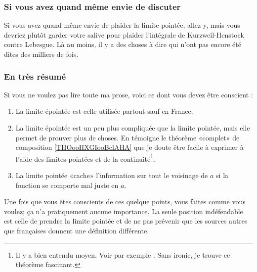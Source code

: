\subsubsection{Si vous avez quand même envie de discuter}

Si vous avez quand même envie de plaider la limite pointée, allez-y, mais vous devriez plutôt garder votre salive pour plaider l'intégrale de Kurzweil-Henstock\cite{BIBooLGJXooZhEXJf} contre Lebesgue. Là au moins, il y a des choses à dire qui n'ont pas encore été dites des milliers de fois.

\subsubsection{En très résumé}

Si vous ne voulez pas lire toute ma prose, voici ce dont vous devez être conscient :
\begin{enumerate}
	\item
	      La limite épointée est celle utilisée partout sauf en France.
	\item
	      La limite épointée est un peu plus compliquée que la limite pointée, mais elle permet de prouver plus de choses. En témoigne le théorème «complet» de composition \ref{THOooHXGIooBclAHA} que je doute être facile à exprimer à l'aide des limites pointées et de la continuité\footnote{Il y a bien entendu moyen. Voir par exemple \cite{BIBooDAGXooRltbgK}. Sans ironie, je trouve ce théorème fascinant.}.
	\item
	      La limite pointée «cache» l'information sur tout le voisinage de \( a\) si la fonction se comporte mal juste en \( a\).
\end{enumerate}
Une fois que vous êtes conscients de ces quelque points, vous faites comme vous voulez; ça n'a pratiquement aucune importance. La seule position indéfendable est celle de prendre la limite pointée et de ne pas prévenir  que les sources autres que françaises donnent une définition différente.

